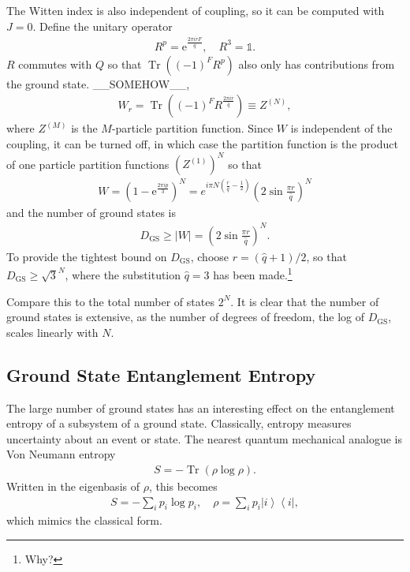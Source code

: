 \documentclass[12pt]{article} %
\newcommand{\abs}[1]{\left|#1\right|}
\renewcommand{\th}[1]{\frac{1}{#1}}
\newcommand{\e}{\text{e}}
\newcommand{\ket}[1]{\left|#1\right\rangle}
\newcommand{\bra}[1]{\left\langle#1\right|}
\DeclareMathOperator{\Tr}{Tr}
\begin{document}
The Witten index is also independent of coupling, so it can be computed with $J=0$. Define the unitary operator 
\begin{align}
R^p = \e^{\frac{2\pi irF}{\hat q}},\quad R^3 = \mathbb{1}.
\end{align}
$R$ commutes with $Q$ so that $\Tr\left((-1)^FR^p\right)$ also only has contributions from the ground state. \_\_SOMEHOW\_\_,
\begin{align}
W_r = \Tr\left((-1)^FR^\frac{2\pi ir}{\hat q}\right) \equiv Z^{(N)},
\end{align}
where $Z^{(M)}$ is the $M$-particle partition function. Since $W$ is independent of the coupling, it can be turned off, in which case the partition function is the product of one particle partition functions $\left(Z^{(1)}\right)^N$ so that 
\begin{align}
W = \left(1-\e^{\frac{2\pi ip}{3}}\right)^N = e^{i\pi N\left(\frac{r}{\hat q} - \th{2}\right)}\left(2\sin\frac{\pi r}{\hat q}\right)^N
\end{align}
and the number of ground states is 
\begin{align}
D_\text{GS} \ge \abs{W} = \left(2\sin\frac{\pi r}{\hat q}\right)^N.
\end{align}
To provide the tightest bound on $D_\text{GS}$, choose $r = (\hat q+1)/2$, so that $D_\text{GS} \ge \sqrt{3}^N$, where the substitution $\hat q = 3$ has been made.\footnote{Why?}

Compare this to the total number of states $2^N$. It is clear that the number of ground states is extensive, as the number of degrees of freedom, the log of $D_\text{GS}$, scales linearly with $N$.

\subsection{Ground State Entanglement Entropy} \emph{}

The large number of ground states has an interesting effect on the entanglement entropy of a subsystem of a ground state. Classically, entropy measures uncertainty about an event or state. The nearest quantum mechanical analogue is Von Neumann entropy
\begin{align}
S = -\Tr(\rho\log\rho).\label{eqn:vnent}
\end{align}
Written in the eigenbasis of $\rho$, this becomes 
\begin{align}
S = -\sum_ip_i\log p_i,\quad \rho = \sum_i p_i\ket{i}\bra{i},
\end{align}
which mimics the classical form.
\end{document}
